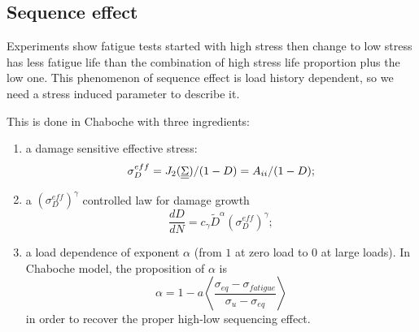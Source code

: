 %
%



\subsection{Sequence effect}

Experiments show fatigue tests started with high stress then change to low stress has less fatigue life than the combination of high stress life proportion plus the low one. This phenomenon of sequence effect is load history dependent, so we need a stress induced parameter to describe it. 

This is done in Chaboche  with three ingredients:

\begin{enumerate} 
\vspace{6pt}
\item a damage sensitive effective stress: 
$$\sigma_D^{eff} = J_2(\uline{\uline{\Sigma}})/(1-D)={A}_{\uppercase\expandafter{\romannumeral2}}/(1-D);$$

\vspace{6pt}

\item a $(\sigma_D^{eff})^\gamma$ controlled  law for damage growth
$$\dfrac{dD}{dN} =c_\gamma {\tilde{D}}^\alpha (\sigma_D^{eff})^\gamma;$$

\vspace{6pt}

\item  a load dependence of exponent $\alpha$ (from $1$ at zero load to $0$ at large loads). In Chaboche model, the proposition of $\alpha$ is
\begin{equation}
\alpha = 1 - a\left\langle \frac{ \sigma_{eq}-\sigma_{fatigue}}{ \sigma_{u} - \sigma_{eq}}\right\rangle
\end{equation}
in order to recover the proper high-low sequencing effect.
\end{enumerate}

